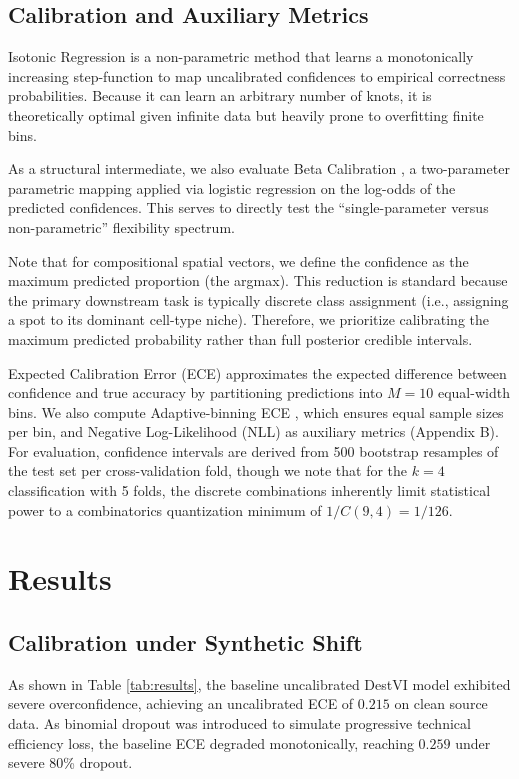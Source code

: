 \documentclass{jmlr} %
\begin{document}
\subsection{Calibration and Auxiliary Metrics}
Isotonic Regression is a non-parametric method that learns a monotonically increasing step-function to map uncalibrated confidences to empirical correctness probabilities. Because it can learn an arbitrary number of knots, it is theoretically optimal given infinite data but heavily prone to overfitting finite bins. 

As a structural intermediate, we also evaluate Beta Calibration \citep{kull2017beta}, a two-parameter parametric mapping applied via logistic regression on the log-odds of the predicted confidences. This serves to directly test the ``single-parameter versus non-parametric'' flexibility spectrum.

Note that for compositional spatial vectors, we define the confidence as the maximum predicted proportion (the argmax). This reduction is standard because the primary downstream task is typically discrete class assignment (i.e., assigning a spot to its dominant cell-type niche). Therefore, we prioritize calibrating the maximum predicted probability rather than full posterior credible intervals.

Expected Calibration Error (ECE) approximates the expected difference between confidence and true accuracy by partitioning predictions into $M=10$ equal-width bins. We also compute Adaptive-binning ECE \citep{nixon2019measuring}, which ensures equal sample sizes per bin, and Negative Log-Likelihood (NLL) as auxiliary metrics (Appendix B). For evaluation, confidence intervals are derived from 500 bootstrap resamples of the test set per cross-validation fold, though we note that for the $k=4$ classification with 5 folds, the discrete combinations inherently limit statistical power to a combinatorics quantization minimum of $1/C(9,4) = 1/126$.

\section{Results}
\label{sec:results}
\subsection{Calibration under Synthetic Shift}
As shown in Table \ref{tab:results}, the baseline uncalibrated DestVI model exhibited severe overconfidence, achieving an uncalibrated ECE of $0.215$ on clean source data. As binomial dropout was introduced to simulate progressive technical efficiency loss, the baseline ECE degraded monotonically, reaching $0.259$ under severe 80\% dropout.
\end{document}
